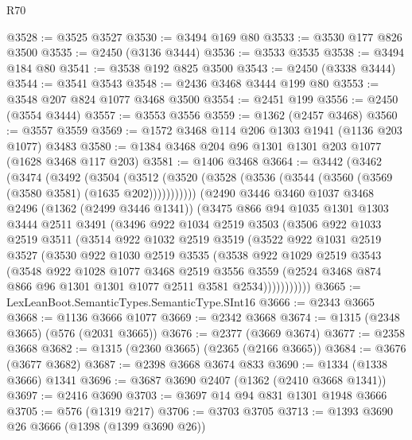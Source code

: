 \begin{lexlean}{R70}
\begin{coremodule}
@3528 := @3525 @3527
@3530 := @3494 @169 @80
@3533 := @3530 @177 @826 @3500
@3535 := @2450 (@3136 @3444)
@3536 := @3533 @3535
@3538 := @3494 @184 @80
@3541 := @3538 @192 @825 @3500
@3543 := @2450 (@3338 @3444)
@3544 := @3541 @3543
@3548 := @2436 @3468 @3444 @199 @80
@3553 := @3548 @207 @824 @1077 @3468 @3500
@3554 := @2451 @199
@3556 := @2450 (@3554 @3444)
@3557 := @3553 @3556
@3559 := @1362 (@2457 @3468)
@3560 := @3557 @3559
@3569 := @1572 @3468 @114 @206 @1303 @1941 (@1136 @203 @1077) @3483
@3580 := @1384 @3468 @204 @96 @1301 @1301 @203 @1077 (@1628 @3468 @117 @203)
@3581 := @1406 @3468
@3664 := @3442
    (@3462
      (@3474
        (@3492
          (@3504
            (@3512 (@3520 (@3528 (@3536 (@3544 (@3560 (@3569 (@3580 @3581) (@1635 @202)))))))))))
      (@2490
        @3446
        @3460
        @1037
        @3468
        @2496
        (@1362 (@2499 @3446 @1341))
        (@3475
          @866
          @94
          @1035
          @1301
          @1303
          @3444
          @2511
          @3491
          (@3496
            @922
            @1034
            @2519
            @3503
            (@3506
              @922
              @1033
              @2519
              @3511
              (@3514
                @922
                @1032
                @2519
                @3519
                (@3522
                  @922
                  @1031
                  @2519
                  @3527
                  (@3530
                    @922
                    @1030
                    @2519
                    @3535
                    (@3538
                      @922
                      @1029
                      @2519
                      @3543
                      (@3548
                        @922
                        @1028
                        @1077
                        @3468
                        @2519
                        @3556
                        @3559
                        (@2524 @3468 @874 @866 @96 @1301 @1301 @1077 @2511 @3581 @2534)))))))))))
@3665 := LexLeanBoot.SemanticTypes.SemanticType.SInt16
@3666 := @2343 @3665
@3668 := @1136 @3666 @1077
@3669 := @2342 @3668
@3674 := @1315 (@2348 @3665) (@576 (@2031 @3665))
@3676 := @2377 (@3669 @3674)
@3677 := @2358 @3668
@3682 := @1315 (@2360 @3665) (@2365 (@2166 @3665))
@3684 := @3676 (@3677 @3682)
@3687 := @2398 @3668 @3674 @833
@3690 := @1334 (@1338 @3666) @1341
@3696 := @3687 @3690 @2407 (@1362 (@2410 @3668 @1341))
@3697 := @2416 @3690
@3703 := @3697 @14 @94 @831 @1301 @1948 @3666
@3705 := @576 (@1319 @217)
@3706 := @3703 @3705
@3713 := @1393 @3690 @26 @3666 (@1398 (@1399 @3690 @26))

\end{coremodule}
\end{lexlean}
